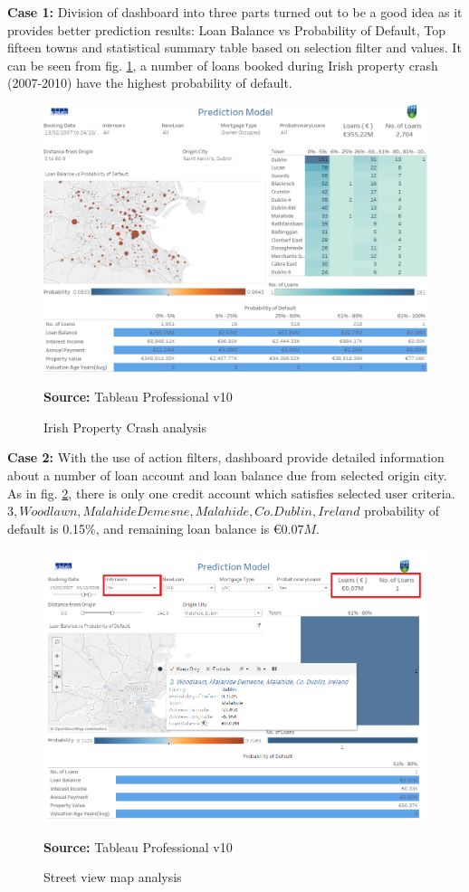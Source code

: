 \textbf{Case 1:} Division of dashboard into three parts turned out to be a good idea as it provides better prediction results: Loan Balance vs Probability of Default, Top fifteen towns and statistical summary table based on selection filter and values. It can be seen from fig. \ref{fig:crash}, a number of loans booked during Irish property crash (2007-2010) have the highest probability of default.

\begin{center}
\begin{figure}[!htb]
\includegraphics[scale=0.5]{crash.png}
\centering
\caption{Irish Property Crash analysis}{\textbf{Source:} Tableau Professional v10}
\label{fig:crash}
\end{figure}
\end{center}

\textbf{Case 2:} With the use of action filters, dashboard provide detailed information about a number of loan account and loan balance due from selected origin city. As in fig. \ref{fig:mala}, there is only one credit account which satisfies selected user criteria. $ 3, Woodlawn, Malahide Demesne, Malahide, Co. Dublin, Ireland$ probability of default is 0.15\%, and remaining loan balance is $€0.07M$.  

\begin{center}
\begin{figure}[!htb]
\includegraphics[scale=0.5]{mala.png}
\centering
\caption{Street view map analysis}{\textbf{Source:} Tableau Professional v10}
\label{fig:mala}
\end{figure}
\end{center}
